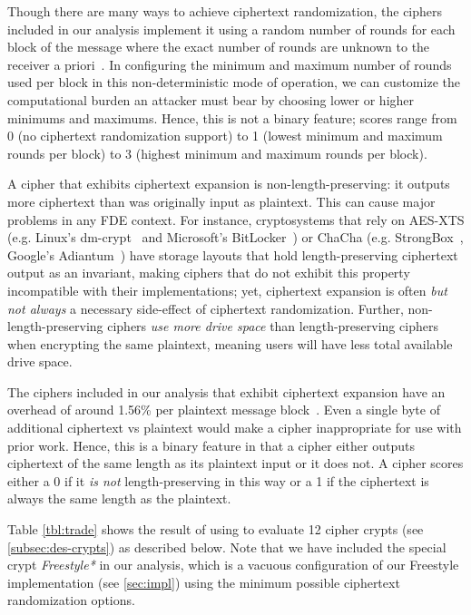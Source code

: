 Though there are many ways to achieve ciphertext randomization, the ciphers
included in our analysis implement it using a random number of rounds for each
block of the message where the exact number of rounds are unknown to the
receiver a priori~\cite{Freestyle}. In configuring the minimum and maximum
number of rounds used per block in this non-deterministic mode of operation, we
can customize the computational burden an attacker must bear by choosing lower
or higher minimums and maximums. Hence, this is not a binary feature; scores
range from 0 (no ciphertext randomization support) to 1 (lowest minimum and
maximum rounds per block) to 3 (highest minimum and maximum rounds per block).


 A cipher that exhibits ciphertext
expansion is non-length-preserving: it outputs more ciphertext than was
originally input as plaintext. This can cause major problems in any FDE context.
For instance, cryptosystems that rely on AES-XTS (e.g. Linux's
dm-crypt~\cite{dmcrypt} and Microsoft's BitLocker~\cite{bitlocker1}) or ChaCha
(e.g. StrongBox~\cite{StrongBox}, Google's Adiantum~\cite{Adiantum}) have
storage layouts that hold length-preserving ciphertext output as an invariant,
making ciphers that do not exhibit this property incompatible with their
implementations; yet, ciphertext expansion is often {\em but not always} a
necessary side-effect of ciphertext randomization. Further,
non-length-preserving ciphers {\em use more drive space} than length-preserving
ciphers when encrypting the same plaintext, meaning users will have less total
available drive space.

The ciphers included in our analysis that exhibit ciphertext expansion have an
overhead of around 1.56\% per plaintext message block~\cite{Freestyle}. Even a
single byte of additional ciphertext vs plaintext would make a cipher
inappropriate for use with prior work. Hence, this is a binary feature in that a
cipher either outputs ciphertext of the same length as its plaintext input or it
does not. A cipher scores either a 0 if it {\em is not} length-preserving in
this way or a 1 if the ciphertext is always the same length as the plaintext.

Table \cref{tbl:trade} shows the result of using \sysC to evaluate 12 cipher
crypts (see \cref{subsec:des-crypts}) as described below. Note that we have
included the special crypt {\em Freestyle*} in our analysis, which is a vacuous
configuration of our Freestyle implementation (see \cref{sec:impl}) using the
minimum possible ciphertext randomization options.


